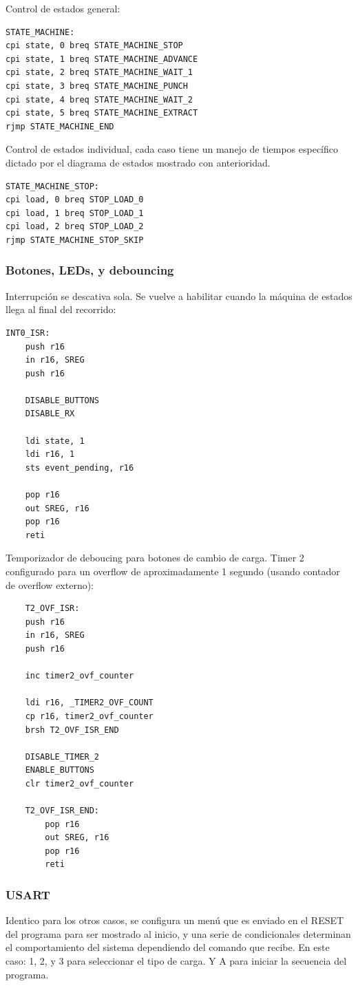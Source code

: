 Control de estados general:
\begin{verbatim}
STATE_MACHINE:
cpi state, 0 breq STATE_MACHINE_STOP
cpi state, 1 breq STATE_MACHINE_ADVANCE
cpi state, 2 breq STATE_MACHINE_WAIT_1
cpi state, 3 breq STATE_MACHINE_PUNCH
cpi state, 4 breq STATE_MACHINE_WAIT_2
cpi state, 5 breq STATE_MACHINE_EXTRACT
rjmp STATE_MACHINE_END
\end{verbatim}

Control de estados individual, cada caso tiene un manejo de tiempos específico dictado por el diagrama de estados mostrado con anterioridad.
\begin{verbatim}
STATE_MACHINE_STOP:
cpi load, 0 breq STOP_LOAD_0
cpi load, 1 breq STOP_LOAD_1
cpi load, 2 breq STOP_LOAD_2
rjmp STATE_MACHINE_STOP_SKIP
\end{verbatim}

\subsubsection{Botones, LEDs,  y debouncing}
Interrupción se descativa sola. Se vuelve a habilitar cuando la máquina de estados llega al final del recorrido:

\begin{verbatim}
INT0_ISR:
    push r16
    in r16, SREG
    push r16 

    DISABLE_BUTTONS
    DISABLE_RX

    ldi state, 1
    ldi r16, 1 
    sts event_pending, r16

    pop r16
    out SREG, r16
    pop r16 
    reti
\end{verbatim}

Temporizador de deboucing para botones de cambio de carga. Timer 2 configurado para un overflow de aproximadamente 1 segundo (usando contador de overflow externo):

\begin{verbatim}
    T2_OVF_ISR:
	push r16 
    in r16, SREG 
	push r16 
	
	inc timer2_ovf_counter
	
	ldi r16, _TIMER2_OVF_COUNT 
    cp r16, timer2_ovf_counter 
    brsh T2_OVF_ISR_END 
    
	DISABLE_TIMER_2
	ENABLE_BUTTONS
	clr timer2_ovf_counter
    
    T2_OVF_ISR_END:
		pop r16
		out SREG, r16
		pop r16	
		reti

\end{verbatim}

\subsubsection{USART}
Identico para los otros casos, se configura un menú que es enviado en el RESET del programa para ser mostrado al inicio, y una serie de condicionales determinan el comportamiento del sistema dependiendo del comando que recibe. En este caso: 1, 2, y 3 para seleccionar el tipo de carga. Y A para iniciar la secuencia del programa.


